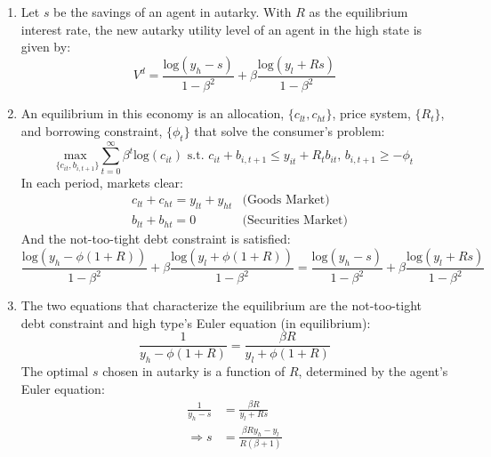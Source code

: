 \documentclass{article}
\newcommand{\loge}[1]{\text{log}\left(#1\right)}
\newcommand{\usmax}[1]{\underset{#1}{\text{max }}}
\begin{document}
\begin{enumerate}
	\item Let $s$ be the savings of an agent in autarky. With $R$ as the equilibrium interest rate, the new autarky utility level of an agent in the high state is given by:
		\[
			V^d = \frac{\loge{y_h-s}}{1-\beta^2} + \beta\frac{\loge{y_l + Rs}}{1-\beta^2}
		\]
	
	\item An equilibrium in this economy is an allocation, ${\{c_{lt},c_{ht}\}}$, price system, $\{R_t\}$, and borrowing constraint, $\{\phi_t\}$ that solve the consumer's problem:
		\[
			\usmax{\{c_{it},b_{i,t+1}\}}\sum_{t=0}^\infty\beta^t\loge{c_{it}}\text{ s.t. }c_{it} + b_{i,t+1}\leq y_{it} + R_tb_{it}\text{, }b_{i,t+1}\geq -\phi_t
		\]
		In each period, markets clear:
		\begin{align*}
			&c_{lt} + c_{ht} = y_{lt} + y_{ht}	&\text{(Goods Market)}		\\
			&b_{lt} + b_{ht} = 0				&\text{(Securities Market)}	
		\end{align*}
		And the not-too-tight debt constraint is satisfied:
		\[
			\frac{\loge{y_h-\phi(1+R)}}{1-\beta^2} + \beta\frac{\loge{y_l +\phi(1+R)}}{1-\beta^2} = \frac{\loge{y_h-s}}{1-\beta^2} + \beta\frac{\loge{y_l + Rs}}{1-\beta^2}
		\]
	
	\item The two equations that characterize the equilibrium are the not-too-tight debt constraint and high type's Euler equation (in equilibrium):
		\[
			\frac{1}{y_h - \phi(1+R)} = \frac{\beta R}{y_l + \phi(1+R)}
		\]
		The optimal $s$ chosen in autarky is a function of $R$, determined by the agent's Euler equation:
		\begin{align*}
			\frac{1}{y_h-s} &= \frac{\beta R}{y_l + Rs}	\\
			\Rightarrow s	&= \frac{\beta R y_h-y_l}{R(\beta+1)}
		\end{align*}
	

\end{enumerate}
\end{document}
